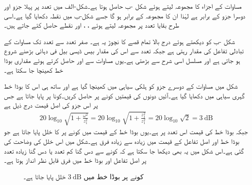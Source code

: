 مساوات  کے اجزاء کا مجموعہ لیتے ہوئے شکل -ب حاصل ہوتا ہے۔شکل-الف میں  تعدد پر پہلا جزو  اور دوسرا جزو  کے برابر ہے لہٰذا ان کا مجموعہ  کے برابر ہو گا جسے شکل-ب میں نقطہ  دکھایا گیا ہے۔اسی طرح بقایا تعدد پر مجموعہ لیتے ہوئے ، ،  اور  نقطے حاصل کئے جاتے ہیں۔

شکل -ب کو دیکھتے ہوئے درج بالا تمام قصے کا نچوڑ یہ ہے۔ صفر تعدد سے   تعدد تک مساوات  کے تبادلی تفاعل کی مقدار  رہتی ہے جبکہ  تعدد سے اس کی مقدار بیس ڈیسی بیل فی دہائی بڑھنے شروع ہو جاتی ہے اور مسلسل اسی شرح سے بڑھتی ہے۔یوں مساوات  سے  اور  حاصل کرتے ہوئے  مقداری بوڈا خط کھینچا جا سکتا ہے۔

شکل  میں مساوات  کے دوسرے جزو  کو ہلکی سیاہی میں کھینچا گیا ہے اور ساتھ ہی اس کا بوڈا خط گہری سیاہی میں دکھایا گیا ہے۔آئیں دونوں کی قیمتیں کونے پر حاصل کریں۔کونا  پر پایا جاتا ہے جس پر اس  جزو کی اصل قیمت درج ذیل ہے
\begin{align}
20\log_{10} \sqrt{1+\frac{\omega^2}{z_1^2}}=20\log_{10}\sqrt{1+\frac{z_1^2}{z_1^2}}=20\log_{10}\sqrt{2}=\SI{3}{\deci\bel}
\end{align}
جبکہ بوڈا خط کی قیمت اس تعدد پر  ہے۔یوں بوڈا خط کے قیمت میں کونے پر  کا خلل پایا جاتا ہے جو بوڈا خط اور اصل تفاعل کے قیمت میں زیادہ سے زیادہ فرق ہے۔شکل  میں اس خلل کی وضاحت کی گئی ہے۔اس شکل میں یہ بھی دیکھا جا سکتا ہے کہ کونے سے دس گنا کم تعدد  یا دس گنا زیادہ تعدد  پر اصل تفاعل اور بوڈا خط میں فرق قابل نظر انداز ہوتا ہے۔
\begin{figure}
\centering
{}
\caption{کونے پر بوڈا خط میں $\SI{3}{\deci\bel}$ خلل پایا جاتا ہے۔}
\label{شکل_تعددی_بوڈا_تین_ڈیسی_بیل_خلل}
\end{figure}


